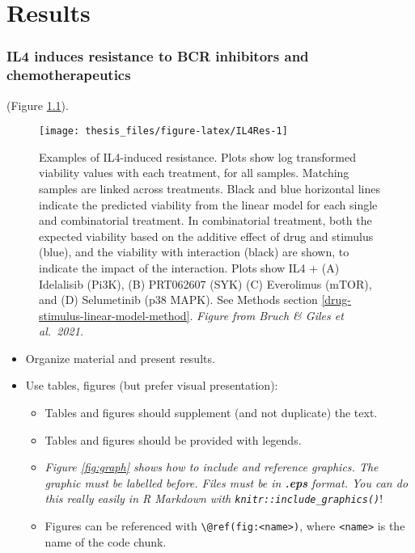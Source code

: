 \documentclass[11pt, a4paper, twosided]{book}
\begin{document}
\hypertarget{chapter7}{%
\chapter{Results}\label{chapter7}}

\hypertarget{IL4resistance}{%
\subsection{IL4 induces resistance to BCR inhibitors and chemotherapeutics}\label{IL4resistance}}

(Figure \ref{fig:IL4Res}).


\begin{figure}

{\centering \texttt{[image: thesis\_files/figure-latex/IL4Res-1]} 

}

\caption{Examples of IL4-induced resistance. Plots show log transformed viability values with each treatment, for all samples. Matching samples are linked across treatments. Black and blue horizontal lines indicate the predicted viability from the linear model for each single and combinatorial treatment. In combinatorial treatment, both the expected viability based on the additive effect of drug and stimulus (blue), and the viability with interaction (black) are shown, to indicate the impact of the interaction. Plots show IL4 + (A) Idelalisib (Pi3K), (B) PRT062607 (SYK) (C) Everolimus (mTOR), and (D) Selumetinib (p38 MAPK). See Methods section \ref{drug-stimulus-linear-model-method}. \emph{Figure from Bruch \& Giles et al.~2021.}}\label{fig:IL4Res}
\end{figure}
\begin{itemize}
\item
  Organize material and present results.
\item
  Use tables, figures (but prefer visual presentation):
  \begin{itemize}
  \item
    Tables and figures should supplement (and not duplicate) the text.
  \item
    Tables and figures should be provided with legends.
  \item
    \emph{Figure \ref{fig:graph} shows how to include and reference graphics.
    The graphic must be labelled before. Files must be in \textbf{.eps} format. You
    can do this really easily in R Markdown with \texttt{knitr::include\_graphics()}}!
  \item
    Figures can be referenced with \texttt{\textbackslash{}@ref(fig:\textless{}name\textgreater{})}, where \texttt{\textless{}name\textgreater{}} is the
    name of the code chunk.
  \end{itemize}
\end{itemize}
\end{document}
